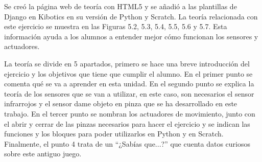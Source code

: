 Se creó la página web de teoría con HTML5  y se añadió a las plantillas de Django en Kibotics en su versión de Python y Scratch. La teoría relacionada con este ejercicio se muestra en las Figuras 5.2, 5.3, 5.4, 5.5, 5.6 y 5.7. Esta información ayuda a  los alumnos a entender mejor cómo funcionan los sensores y actuadores.

La teoría se divide en 5 apartados, primero se hace una breve introducción del ejercicio y los objetivos que tiene que cumplir el alumno. En el primer punto se comenta qué se va a aprender en esta unidad. En el segundo punto se explica la teoría de los sensores que se van a utilizar, en este caso, son necesarios el sensor infrarrojos y el sensor dame objeto en pinza que se ha desarrollado en este trabajo. En el tercer punto se nombran los actuadores de movimiento, junto con  el abrir y cerrar de las pinzas necesarios para hacer el ejercicio y se indican las funciones y los bloques para poder utilizarlos en Python y en Scratch. Finalmente, el punto 4 trata de un ``¿Sabías que...?''  que cuenta datos curiosos sobre este antiguo juego.


